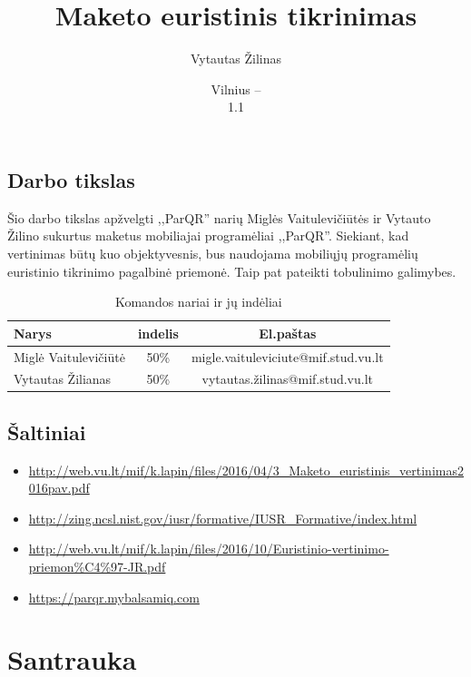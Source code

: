 \documentclass{VUMIFPSkursinis}
\title{Maketo euristinis tikrinimas}
\author{Vytautas Žilinas}
\date{Vilnius – \the\year\\ 1.1}
\begin{document}
\maketitle

\tableofcontents
{}


\subsection*{Darbo tikslas}

Šio darbo tikslas apžvelgti ,,ParQR'' narių Miglės Vaitulevičiūtės ir Vytauto Žilino sukurtus maketus mobiliajai programėliai ,,ParQR''. Siekiant, kad vertinimas būtų kuo objektyvesnis, bus naudojama mobiliųjų programėlių euristinio tikrinimo pagalbinė priemonė. Taip pat pateikti tobulinimo galimybes.

\begin{table}[H]\footnotesize
  \centering
  \caption{Komandos nariai ir jų indėliai}
  {\begin{tabular}{|l|c|c|} \hline
    Narys & indelis & El.paštas \\
    \hline
    Miglė Vaitulevičiūtė& 50\% & migle.vaituleviciute@mif.stud.vu.lt  \\     
	Vytautas Žilianas   & 50\% & vytautas.žilinas@mif.stud.vu.lt  \\     
    \hline
  \end{tabular}}
  \label{tab:komanda}
\end{table}

\subsection*{Šaltiniai}
\begin{itemize}
	\item \url{http://web.vu.lt/mif/k.lapin/files/2016/04/3_Maketo_euristinis_vertinimas2016pav.pdf}
	\item \url{http://zing.ncsl.nist.gov/iusr/formative/IUSR_Formative/index.html}
	\item \url{http://web.vu.lt/mif/k.lapin/files/2016/10/Euristinio-vertinimo-priemon%C4%97-JR.pdf}
	\item \url{https://parqr.mybalsamiq.com}
\end{itemize}

\section{Santrauka}
\end{document}
